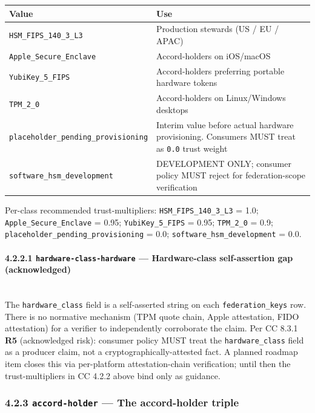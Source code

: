 \documentclass[11pt]{article}
\begin{document}
{\footnotesize
\begin{longtable}{|p{8.0cm}|p{8.0cm}|}\hline
\textbf{Value} & \textbf{Use} \\ \hline\endhead
\texttt{HSM\_FIPS\_140\_3\_L3} & Production stewards (US / EU / APAC) \\ \hline
\texttt{Apple\_Secure\_Enclave} & Accord-holders on iOS/macOS \\ \hline
\texttt{YubiKey\_5\_FIPS} & Accord-holders preferring portable hardware tokens \\ \hline
\texttt{TPM\_2\_0} & Accord-holders on Linux/Windows desktops \\ \hline
\texttt{placeholder\_pending\_provisioning} & Interim value before actual hardware provisioning. Consumers MUST treat as \texttt{0.0} trust weight \\ \hline
\texttt{software\_hsm\_development} & DEVELOPMENT ONLY; consumer policy MUST reject for federation-scope verification \\ \hline
\end{longtable}}


Per-class recommended trust-multipliers: \texttt{HSM\_FIPS\_140\_3\_L3} = 1.0; \texttt{Apple\_Secure\_Enclave} = 0.95; \texttt{YubiKey\_5\_FIPS} = 0.95; \texttt{TPM\_2\_0} = 0.9; \texttt{placeholder\_pending\_provisioning} = 0.0; \texttt{software\_hsm\_development} = 0.0.


\paragraph{4.2.2.1 \texttt{hardware-class-hardware} — Hardware-class self-assertion gap (acknowledged)}\mbox{}\\


The \texttt{hardware\_class} field is a self-asserted string on each \texttt{federation\_keys} row. There is no normative mechanism (TPM quote chain, Apple attestation, FIDO attestation) for a verifier to independently corroborate the claim. Per CC 8.3.1 \textbf{R5} (acknowledged risk): consumer policy MUST treat the \texttt{hardware\_class} field as a producer claim, not a cryptographically-attested fact. A planned roadmap item closes this via per-platform attestation-chain verification; until then the trust-multipliers in CC 4.2.2 above bind only as guidance.


\subsubsection*{4.2.3 \texttt{accord-holder} — The accord-holder triple}
\end{document}
